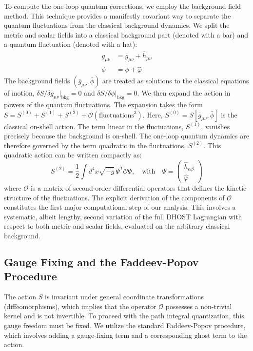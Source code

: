 \documentclass[twocolumn]{aastex631}
\begin{document}
To compute the one-loop quantum corrections, we employ the background field method. This technique provides a manifestly covariant way to separate the quantum fluctuations from the classical background dynamics. We split the metric and scalar fields into a classical background part (denoted with a bar) and a quantum fluctuation (denoted with a hat):
\begin{align}
    g_{\mu\nu} &= \bar{g}_{\mu\nu} + \hat{h}_{\mu\nu} \\
    \phi &= \bar{\phi} + \hat{\varphi}
\end{align}
The background fields $(\bar{g}_{\mu\nu}, \bar{\phi})$ are treated as solutions to the classical equations of motion, $\delta S / \delta g_{\mu\nu}|_{\text{bkg}} = 0$ and $\delta S / \delta \phi|_{\text{bkg}} = 0$. We then expand the action in powers of the quantum fluctuations. The expansion takes the form $S = S^{(0)} + S^{(1)} + S^{(2)} + \mathcal{O}(\text{fluctuations}^3)$. Here, $S^{(0)} = S[\bar{g}_{\mu\nu}, \bar{\phi}]$ is the classical on-shell action. The term linear in the fluctuations, $S^{(1)}$, vanishes precisely because the background is on-shell. The one-loop quantum dynamics are therefore governed by the term quadratic in the fluctuations, $S^{(2)}$. This quadratic action can be written compactly as:
\begin{equation}
    S^{(2)} = \frac{1}{2} \int d^4x \sqrt{-\bar{g}} \, \Psi^T \mathbf{\mathcal{O}} \Psi, \quad \text{with} \quad \Psi = \begin{pmatrix} \hat{h}_{\alpha\beta} \\ \hat{\varphi} \end{pmatrix}
\end{equation}
where $\mathbf{\mathcal{O}}$ is a matrix of second-order differential operators that defines the kinetic structure of the fluctuations. The explicit derivation of the components of $\mathbf{\mathcal{O}}$ constitutes the first major computational step of our analysis. This involves a systematic, albeit lengthy, second variation of the full DHOST Lagrangian with respect to both metric and scalar fields, evaluated on the arbitrary classical background.

\subsection{Gauge Fixing and the Faddeev-Popov Procedure}

The action $S$ is invariant under general coordinate transformations (diffeomorphisms), which implies that the operator $\mathbf{\mathcal{O}}$ possesses a non-trivial kernel and is not invertible. To proceed with the path integral quantization, this gauge freedom must be fixed. We utilize the standard Faddeev-Popov procedure, which involves adding a gauge-fixing term and a corresponding ghost term to the action.
\end{document}
